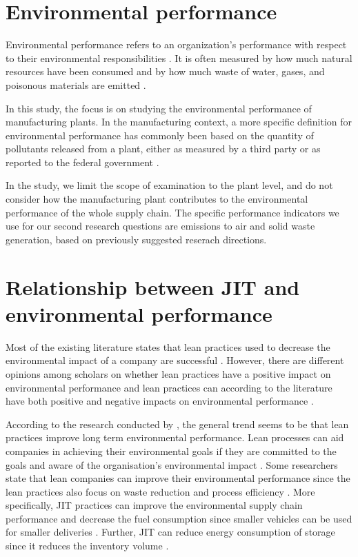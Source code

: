 \section{Environmental performance}
Environmental performance refers to an organization’s performance with respect to their environmental responsibilities \citep{maoLowCarbonSupply2017, mollenkopfGreenLeanGlobal2010}. 
It is often measured by how much natural resources have been consumed and by how much waste of water, gases, and poisonous materials are emitted \citep{maoLowCarbonSupply2017}.
 
In this study, the focus is on studying the environmental performance of manufacturing plants. In the manufacturing context, a more specific definition for environmental performance has commonly been based on the quantity of pollutants released from a plant, either as measured by a third party \citep{bragdonAntecedentsGreenValue2005} or as reported to the federal government \citep{freedmanDeterminantsPollutionPrevention1998, klassenMakingEnvironmentalSustainability2010}.
 
In the study, we limit the scope of examination to the plant level, and do not consider how the manufacturing plant contributes to the environmental performance of the whole supply chain. The specific performance indicators we use for our second research questions are emissions to air and solid waste generation, based on previously suggested reserach directions. \citep{diesteRelationshipLeanEnvironmental2019}

\section{Relationship between JIT and environmental performance}
Most of the existing literature states that lean practices used to decrease the environmental impact of a company are successful \citep{diesteEvaluatingImpactLean2020}. 
However, there are different opinions among scholars on whether lean practices have a positive impact on environmental performance and lean practices can according to the literature have both positive and negative impacts on environmental performance \citep{diesteEvaluatingImpactLean2020}.

According to the research conducted by \citep{diesteEvaluatingImpactLean2020}, the general trend seems to be that lean practices improve long term environmental performance. 
Lean processes can aid companies in achieving their environmental goals if they are committed to the goals and aware of the organisation’s environmental impact \citep{diesteEvaluatingImpactLean2020}. 
Some researchers state that lean companies can improve their environmental performance since the lean practices also focus on waste reduction and process efficiency \citep{diesteEvaluatingImpactLean2020}. 
More specifically, JIT practices can improve the environmental supply chain performance \citep{cherrafiLeanGreenPractices2018, diesteEvaluatingImpactLean2020} and decrease the fuel consumption since smaller vehicles can be used for smaller deliveries \citep{garza-reyesLeanGreenTransport2016}. 
Further, JIT can reduce energy consumption of storage since it reduces the inventory volume \citep{garza-reyesEffectLeanMethods2018}.

